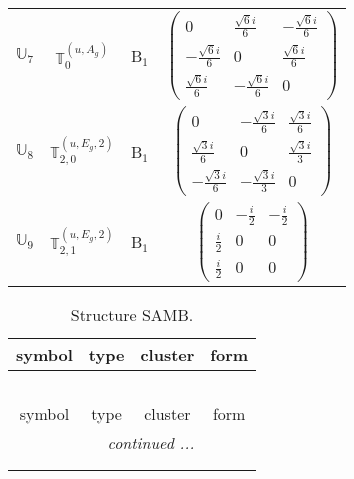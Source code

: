 \documentclass[fleqn,10pt,landscape]{article}
\begin{document}
\begin{itemize}
\begin{center}
\begin{longtable}{c|c|c|c}
$ \mathbb{U}_{7} $ & $\mathbb{T}_{0}^{(u,A_{g})}$ & B$_{1}$ & $\begin{pmatrix} 0 & \frac{\sqrt{6} i}{6} & - \frac{\sqrt{6} i}{6} \\ - \frac{\sqrt{6} i}{6} & 0 & \frac{\sqrt{6} i}{6} \\ \frac{\sqrt{6} i}{6} & - \frac{\sqrt{6} i}{6} & 0 \end{pmatrix}$ \\
$ \mathbb{U}_{8} $ & $\mathbb{T}_{2,0}^{(u,E_{g},2)}$ & B$_{1}$ & $\begin{pmatrix} 0 & - \frac{\sqrt{3} i}{6} & \frac{\sqrt{3} i}{6} \\ \frac{\sqrt{3} i}{6} & 0 & \frac{\sqrt{3} i}{3} \\ - \frac{\sqrt{3} i}{6} & - \frac{\sqrt{3} i}{3} & 0 \end{pmatrix}$ \\
$ \mathbb{U}_{9} $ & $\mathbb{T}_{2,1}^{(u,E_{g},2)}$ & B$_{1}$ & $\begin{pmatrix} 0 & - \frac{i}{2} & - \frac{i}{2} \\ \frac{i}{2} & 0 & 0 \\ \frac{i}{2} & 0 & 0 \end{pmatrix}$ \\
\end{longtable}
\end{center}
\begin{center}
\renewcommand{\arraystretch}{1.3}
\begin{longtable}{c|c|c|c}
\caption{Structure SAMB.}
 \\
 \hline \hline
symbol & type & cluster & form \\ \hline \endfirsthead

\multicolumn{3}{l}{\tablename\ \thetable{}} \\
 \hline \hline
symbol & type & cluster & form \\ \hline \endhead

 \hline \hline
\multicolumn{3}{r}{\footnotesize\it continued ...} \\ \endfoot

 \hline \hline
\multicolumn{3}{r}{} \\ \endlastfoot


\end{longtable}
\end{center}
\end{itemize}
\end{document}
